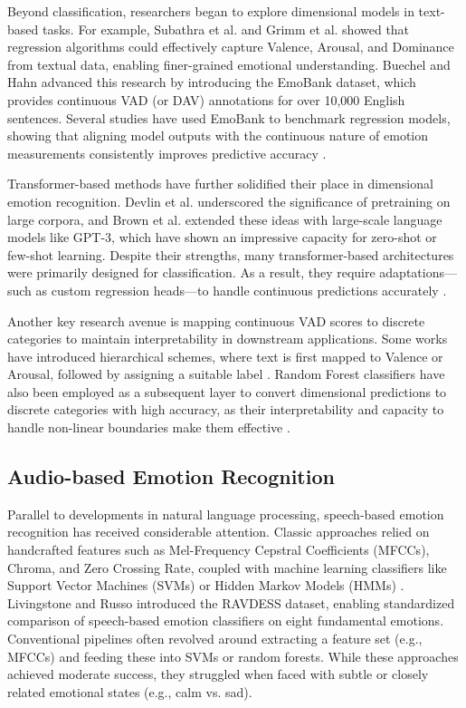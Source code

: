 \documentclass[conference]{IEEEtran}
\begin{document}
Beyond classification, researchers began to explore dimensional models in text-based tasks. For example, Subathra et al. \cite{subathra2023comparative} and Grimm et al. \cite{grimm2007svr} showed that regression algorithms could effectively capture Valence, Arousal, and Dominance from textual data, enabling finer-grained emotional understanding. Buechel and Hahn \cite{buechel2017emobank} advanced this research by introducing the EmoBank dataset, which provides continuous VAD (or DAV) annotations for over 10,000 English sentences. Several studies have used EmoBank to benchmark regression models, showing that aligning model outputs with the continuous nature of emotion measurements consistently improves predictive accuracy \cite{subathra2023comparative, grimm2007svr, buechel2017emobank}.

Transformer-based methods have further solidified their place in dimensional emotion recognition. Devlin et al. \cite{devlin2018bert} underscored the significance of pretraining on large corpora, and Brown et al. \cite{brown2020gpt3} extended these ideas with large-scale language models like GPT-3, which have shown an impressive capacity for zero-shot or few-shot learning. Despite their strengths, many transformer-based architectures were primarily designed for classification. As a result, they require adaptations—such as custom regression heads—to handle continuous predictions accurately \cite{sun2019bert, he2020deberta}.

Another key research avenue is mapping continuous VAD scores to discrete categories to maintain interpretability in downstream applications. Some works have introduced hierarchical schemes, where text is first mapped to Valence or Arousal, followed by assigning a suitable label \cite{kaya2015contrasting}. Random Forest classifiers have also been employed as a subsequent layer to convert dimensional predictions to discrete categories with high accuracy, as their interpretability and capacity to handle non-linear boundaries make them effective \cite{grimm2007svr, subathra2023comparative}.

\subsection{Audio-based Emotion Recognition}
Parallel to developments in natural language processing, speech-based emotion recognition has received considerable attention. Classic approaches relied on handcrafted features such as Mel-Frequency Cepstral Coefficients (MFCCs), Chroma, and Zero Crossing Rate, coupled with machine learning classifiers like Support Vector Machines (SVMs) or Hidden Markov Models (HMMs) \cite{akcay2020speech, tao2005affective}. Livingstone and Russo \cite{livingstone2018ryerson} introduced the RAVDESS dataset, enabling standardized comparison of speech-based emotion classifiers on eight fundamental emotions. Conventional pipelines often revolved around extracting a feature set (e.g., MFCCs) and feeding these into SVMs or random forests. While these approaches achieved moderate success, they struggled when faced with subtle or closely related emotional states (e.g., calm vs. sad).
\end{document}
